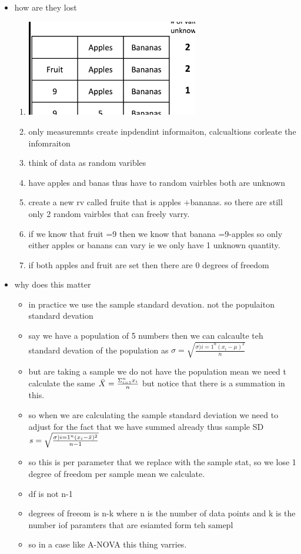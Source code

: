 \documentclass{article}
\begin{document}
\begin{itemize}
\begin{enumerate}
\end{enumerate}
\item how are they lost 
\begin{enumerate}
\item  \includegraphics[width=7.5cm]{Final_Review/lecture_4/df_example.jpg}
\item only measuremnts create inpdendint informaiton, calcualtions corleate the infomraiton 
    \item think of data as random varibles
    \item have apples and banas thus have to random vairbles both are unknown 
    \item create a new rv called fruite that is apples +bananas. so there are still only 2 random vairbles that can freely varry.
    \item if we know that fruit =9 then we know that banana =9-apples so only either apples or banans can vary ie we only have 1 unknown quantity. 
    \item if both apples and fruit are set then there are 0 degrees of freedom 
\end{enumerate}
\item why does this matter
\begin{itemize}
    \item in practice we use the sample standard devation. not the populaiton standard devation 
    \item say we have a population of 5 numbers then we can calcaulte teh standard devation of the population as $\sigma=\sqrt{\frac{\sigma){i=1}^{n}(x_{i}-\mu)^2}{n}}$
    \item but are taking a sample we do not have the population mean we need t calculate the same $\Bar{X}=\frac{\Sigma_{i=1}^{n}x_i}{n}$ but notice that there is a summation in this. 
    \item so when we are calculating the sample standard deviation we need to adjust for the fact that we have summed already thus sample SD $ s=\sqrt{\frac{\sigma){i=1}^{n}(x_{i}-\Bar{x})^2}{n-1}}$
    \item so this is per parameter that we replace with the sample stat, so we lose 1 degree of freedom per sample mean we calculate. 
    \item df is not n-1
    \item degrees of freeom is n-k where n is the number of data points and k is the number iof paramters that are esiamted form teh samepl
    \item so in a case like A-NOVA this thing varries. 
\end{itemize}

\end{itemize}
\end{document}
